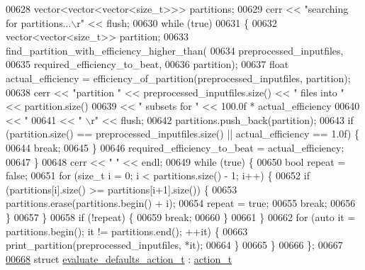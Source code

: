 \begin{DoxyCode}
{{{{00628     vector<vector<vector<size\_t>>> partitions;
00629     cerr << \textcolor{stringliteral}{"searching for partitions...\(\backslash\)r"} << flush;
00630     \textcolor{keywordflow}{while} (\textcolor{keyword}{true})
00631     \{
00632       vector<vector<size\_t>> partition;
00633       find\_partition\_with\_efficiency\_higher\_than(
00634         preprocessed\_inputfiles,
00635         required\_efficiency\_to\_beat,
00636         partition);
00637       \textcolor{keywordtype}{float} actual\_efficiency = efficiency\_of\_partition(preprocessed\_inputfiles, partition);
00638       cerr << \textcolor{stringliteral}{"partition "} << preprocessed\_inputfiles.size() << \textcolor{stringliteral}{" files into "} << partition.size()
00639            << \textcolor{stringliteral}{" subsets for "} << 100.0f * actual\_efficiency
00640            << \textcolor{stringliteral}{" %
00641            << \textcolor{stringliteral}{"                  \(\backslash\)r"} << flush;
00642       partitions.push\_back(partition);
00643       \textcolor{keywordflow}{if} (partition.size() == preprocessed\_inputfiles.size() || actual\_efficiency == 1.0f) \{
00644         \textcolor{keywordflow}{break};
00645       \}
00646       required\_efficiency\_to\_beat = actual\_efficiency;
00647     \}
00648     cerr << \textcolor{stringliteral}{"                                                                  "} << endl;
00649     \textcolor{keywordflow}{while} (\textcolor{keyword}{true}) \{
00650       \textcolor{keywordtype}{bool} repeat = \textcolor{keyword}{false};
00651       \textcolor{keywordflow}{for} (\textcolor{keywordtype}{size\_t} i = 0; i < partitions.size() - 1; i++) \{
00652         \textcolor{keywordflow}{if} (partitions[i].size() >= partitions[i+1].size()) \{
00653           partitions.erase(partitions.begin() + i);
00654           repeat = \textcolor{keyword}{true};
00655           \textcolor{keywordflow}{break};
00656         \}
00657       \}
00658       \textcolor{keywordflow}{if} (!repeat) \{
00659         \textcolor{keywordflow}{break};
00660       \}
00661     \}
00662     \textcolor{keywordflow}{for} (\textcolor{keyword}{auto} it = partitions.begin(); it != partitions.end(); ++it) \{
00663       print\_partition(preprocessed\_inputfiles, *it);
00664     \}
00665   \}
00666 \};
00667 
\hyperlink{structevaluate__defaults__action__t}{00668} \textcolor{keyword}{struct }\hyperlink{structevaluate__defaults__action__t}{evaluate\_defaults\_action\_t} : \hyperlink{structaction__t}{action\_t}
}}}}}
\end{DoxyCode}

